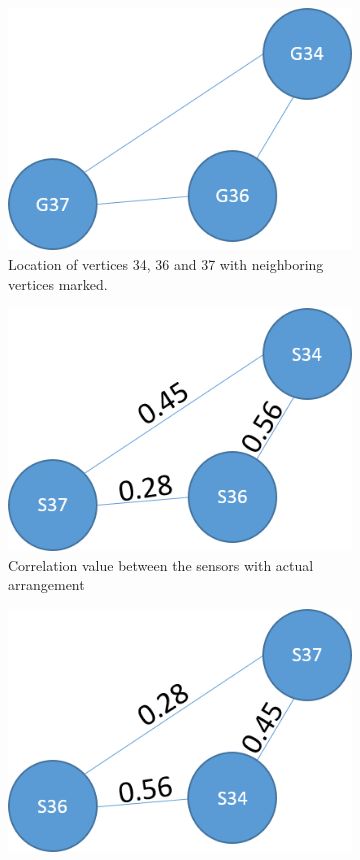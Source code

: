 \begin{figure}[!ht]
\centering
\begin{subfigure}[b]{0.4\textwidth}
\centering
\includegraphics[scale=0.5]{./pics/grid_arr.png}
\caption{Location of vertices 34, 36 and 37 with neighboring vertices marked.}
\label{fig:true_arr}
\qquad
\end{subfigure}
\begin{subfigure}[b]{0.4\textwidth}
\centering
\includegraphics[scale=0.5]{./pics/true_arr.png}
\caption{Correlation value between the sensors with actual arrangement}
\label{fig:true_arr}
\qquad
\end{subfigure}
\begin{subfigure}[b]{0.4\textwidth}
\centering
\includegraphics[scale=0.5]{./pics/computer_arr.png}

\end{subfigure}
\end{figure}
